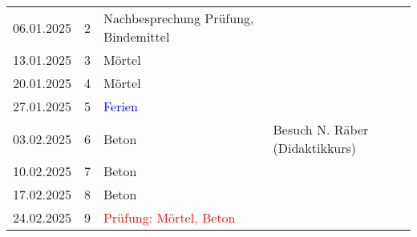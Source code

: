 \documentclass[
11pt,
captions=tableheading,
headings=big,
headsepline,
footsepline, 
captions=tableheading,
parskip=half-,
]{scrartcl}
\newcommand{\red}[1]{\textcolor{red}{#1}}
\begin{document}
\begin{table}[H]
\begin{tabular}{llp{8cm}p{4cm}}
        \midrule
        06.01.2025     & 2           & Nachbesprechung Prüfung, Bindemittel                     & {}                  \\
        13.01.2025     & 3           & Mörtel                                                   & {}                  \\
        20.01.2025     & 4           & Mörtel                                                    & {}                  \\
        \midrule
        27.01.2025     & 5           & \textcolor{blue}{Ferien}                                 & {}                  \\
        \midrule
        03.02.2025     & 6           & Beton                                                    & Besuch N. Räber (Didaktikkurs)                  \\
        10.02.2025     & 7           & Beton                                                    & {}                  \\
        17.02.2025     & 8           & Beton                                                    & {}                  \\
        24.02.2025     & 9           & \red{Prüfung: Mörtel, Beton}                             &                     \\
        \bottomrule
    \end{tabular}
\end{table}
\end{document}
